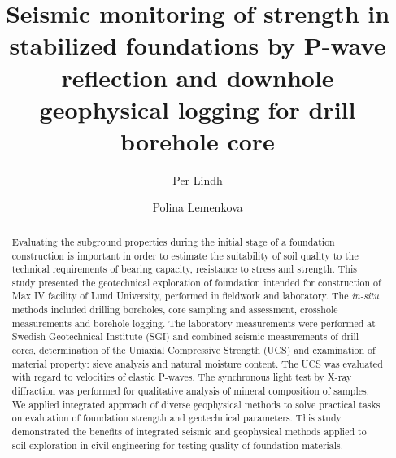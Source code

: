 \documentclass[USenglish,twocolumn]{article}
\begin{document}
 
\author[1]{Per Lindh}
\author*[2]{Polina Lemenkova}

  \title{\huge Seismic monitoring of strength in stabilized foundations by P-wave reflection and downhole geophysical logging for drill borehole core}
  

\begin{abstract}
{Evaluating the subground properties during the initial stage of a foundation construction is important in order to estimate the suitability of soil quality to the technical requirements of bearing capacity, resistance to stress and strength. This study presented the geotechnical exploration of foundation intended for construction of Max IV facility of Lund University, performed in fieldwork and laboratory. The \emph{in-situ} methods included drilling boreholes, core sampling and assessment, crosshole measurements and borehole logging. The laboratory measurements were performed at Swedish Geotechnical Institute (SGI) and combined seismic measurements of drill cores, determination of the Uniaxial Compressive Strength (UCS) and examination of material property: sieve analysis and natural moisture content. The UCS was evaluated with regard to velocities of elastic P-waves. The synchronous light test by X-ray diffraction was performed for qualitative analysis of mineral composition of samples. We applied integrated approach of diverse geophysical methods to solve practical  tasks on evaluation of foundation strength and geotechnical parameters. This study demonstrated the benefits of integrated seismic and geophysical methods applied to soil exploration in civil engineering for testing quality of foundation materials.}
\end{abstract}
 
\end{document}
